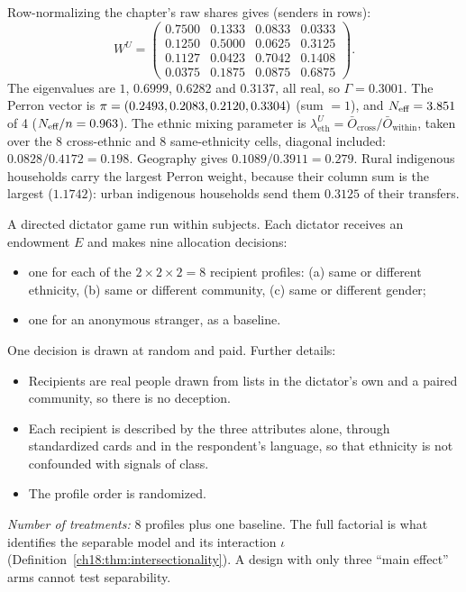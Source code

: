 \documentclass[../solutions_manual.tex]{subfiles}
\begin{document}
 Row-normalizing the chapter's raw shares gives (senders in rows):
\[
W^U = \begin{pmatrix} 0.7500 & 0.1333 & 0.0833 & 0.0333\\ 0.1250 & 0.5000 & 0.0625 & 0.3125\\ 0.1127 & 0.0423 & 0.7042 & 0.1408\\ 0.0375 & 0.1875 & 0.0875 & 0.6875\end{pmatrix}.
\]
The eigenvalues are $1$, $0.6999$, $0.6282$ and $0.3137$, all real, so $\Gamma = 0.3001$. The Perron vector is $\pi = (0.2493, 0.2083, 0.2120, 0.3304)$ (sum $= 1$), and $N_{\text{eff}} = 3.851$ of 4 ($N_{\text{eff}}/n = 0.963$). The ethnic mixing parameter is $\lambda^U_{\text{eth}} = \bar O_{\text{cross}}/\bar O_{\text{within}}$, taken over the 8 cross-ethnic and 8 same-ethnicity cells, diagonal included: $0.0828/0.4172 = 0.198$. Geography gives $0.1089/0.3911 = 0.279$. Rural indigenous households carry the largest Perron weight, because their column sum is the largest ($1.1742$): urban indigenous households send them $0.3125$ of their transfers.


 A directed dictator game run within subjects. Each dictator receives an endowment $E$ and makes nine allocation decisions:
\begin{itemize}
\item one for each of the $2 \times 2 \times 2 = 8$ recipient profiles: (a) same or different ethnicity, (b) same or different community, (c) same or different gender;
\item one for an anonymous stranger, as a baseline.
\end{itemize}
One decision is drawn at random and paid. Further details:
\begin{itemize}
\item Recipients are real people drawn from lists in the dictator's own and a paired community, so there is no deception.
\item Each recipient is described by the three attributes alone, through standardized cards and in the respondent's language, so that ethnicity is not confounded with signals of class.
\item The profile order is randomized.
\end{itemize}
\emph{Number of treatments:} 8 profiles plus one baseline. The full factorial is what identifies the separable model and its interaction $\iota$ (Definition~\ref{ch18:thm:intersectionality}). A design with only three ``main effect'' arms cannot test separability.
\end{document}
